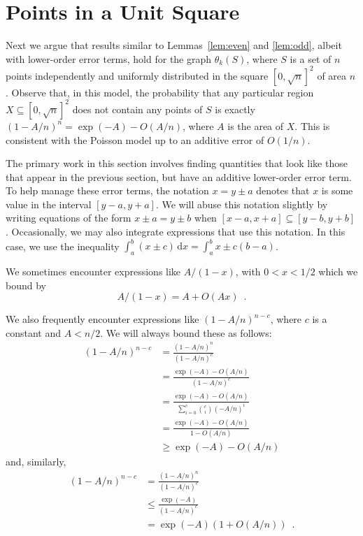 \documentclass{patmorin}
\begin{document}
\section{Points in a Unit Square}

Next we argue that results similar to Lemmas~\ref{lem:even} and
\ref{lem:odd}, albeit with lower-order error terms, hold for the
graph $\theta_k(S)$, where $S$ is a set of $n$ points independently
and uniformly distributed in the square $[0,\sqrt{n}]^2$ of area $n$.
Observe that, in this model, the probability that any particular region
$X\subseteq [0,\sqrt{n}]^2$ does not contain any points of $S$ is exactly
$(1-A/n)^n=\exp(-A)-O(A/n)$, where $A$ is the area of $X$.  This is
consistent with the Poisson model up to an additive error of $O(1/n)$.

The primary work in this section involves finding quantities that look
like those that appear in the previous section, but have an additive
lower-order error term.  To help manage these error terms, the
notation $x= y\pm a$ denotes that $x$ is some value in the interval
$[y-a,y+a]$.  We will abuse this notation slightly by writing equations
of the form $x\pm a = y\pm b$ when $[x-a,x+a]\subseteq[y-b,y+b]$.
Occasionally, we may also integrate expressions that use this notation.
In this case, we use the inequality $\int_a^b (x\pm c)\,\mathrm{d}x =
\int_a^b x \pm c(b-a)$.

We sometimes encounter expressions like $A/(1-x)$, with $0<x<1/2$ which
we bound by
\[
   A/(1-x) = A+O(Ax) \enspace .
\]

We also frequently encounter expressions like $(1-A/n)^{n-c}$, where $c$
is a constant and $A < n/2$.  We will always bound these as follows:
\begin{align*}
   (1-A/n)^{n-c} 
      & = \frac{(1-A/n)^n}{(1-A/n)^c} \\
      & = \frac{\exp(-A)-O(A/n)}{(1-A/n)^c} \\
      & = \frac{\exp(-A)-O(A/n)}{\sum_{i=0}^c \binom{c}{i}(-A/n)^i} \\
      & = \frac{\exp(-A)-O(A/n)}{1-O(A/n)} \\
      & \ge \exp(-A) - O(A/n) 
\end{align*}
and, similarly, 
\begin{align*}
   (1-A/n)^{n-c} 
      & = \frac{(1-A/n)^n}{(1-A/n)^c} \\
      & \le \frac{\exp(-A)}{(1-A/n)^c} \\
      & = \exp(-A)(1+O(A/n))  \enspace .
\end{align*}
\end{document}
